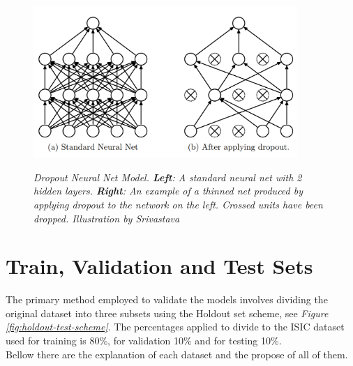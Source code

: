 \begin{figure}[H]
\centering
\includegraphics[width=10cm]{imatges/preliminaries/dropout.png}
\caption[Dropout]{\textit{Dropout Neural Net Model. \textbf{Left}: A standard neural net with 2 hidden layers. \textbf{Right}:
An example of a thinned net produced by applying dropout to the network on the left.
Crossed units have been dropped. Illustration by Srivastava}}
{\label{fig:dropout}}
\end{figure}

\section{Train, Validation and Test Sets}

The primary method employed to validate the models involves dividing the original dataset into three subsets using the Holdout set scheme, see \textit{Figure \ref{fig:holdout-test-scheme}}. The percentages applied to divide to the ISIC dataset used for training is 80\%, for validation 10\% and for testing 10\%. \\

Bellow there are the explanation of each dataset and the propose of all of them.

